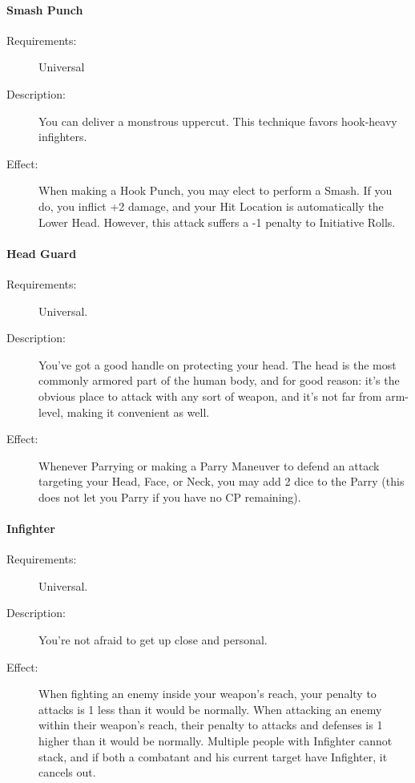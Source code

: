 \documentclass[oneside,11pt,english]{book}
\begin{document}
\paragraph{Smash Punch}\label{talent:Smash Punch}
	\begin{description}
		\item [Requirements:] Universal 
		\item [Description:] You can deliver a monstrous uppercut. This technique favors hook-heavy infighters. 
		\item [Effect:] When making a Hook Punch, you may elect to perform a Smash. If you do, you inflict +2 
damage, and your Hit Location is automatically the Lower Head. However, this attack suffers a -1 penalty 
to Initiative Rolls. 
	\end{description}
\paragraph{Head Guard}\label{talent:Head Guard}
	\begin{description}
		\item [Requirements:] Universal. 
		\item [Description:] You’ve got a good handle on protecting your head. The head is the most commonly 
armored part of the human body, and for good reason: it’s the obvious place to attack with any sort of 
weapon, and it’s not far from arm-level, making it convenient as well. 
		\item [Effect:] Whenever Parrying or making a Parry Maneuver to defend an attack targeting your Head, Face, or 
Neck, you may add 2 dice to the Parry (this does not let you Parry if you have no CP remaining). 

	\end{description}
\paragraph{Infighter}\label{talent:Infighter}
	\begin{description}
		\item [Requirements:] Universal. 
		\item [Description:] You’re not afraid to get up close and personal. 
		\item [Effect:] When fighting an enemy inside your weapon's reach, your penalty to attacks is 1 less than it would be normally. When attacking an enemy within their weapon’s reach, their penalty to attacks and 
defenses is 1 higher than it would be normally. Multiple people with Infighter cannot stack, and if both a 
combatant and his current target have Infighter, it cancels out. 

	\end{description}
\end{document}

